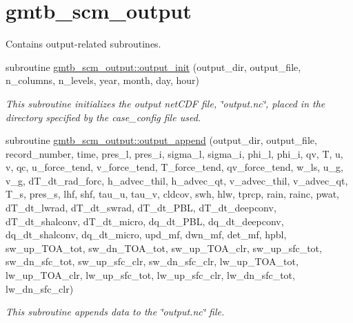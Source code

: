 \hypertarget{group__output}{}\section{gmtb\+\_\+scm\+\_\+output}
\label{group__output}


Contains output-\/related subroutines.  


\begin{DoxyCompactItemize}
\item 
subroutine \hyperlink{group__output_gaa9451ee5665313bbfefdd24800338a95}{gmtb\+\_\+scm\+\_\+output\+::output\+\_\+init} (output\+\_\+dir, output\+\_\+file, n\+\_\+columns, n\+\_\+levels, year, month, day, hour)
\begin{DoxyCompactList}\small\item\em This subroutine initializes the output net\+C\+DF file, \char`\"{}output.\+nc\char`\"{}, placed in the directory specified by the case\+\_\+config file used. \end{DoxyCompactList}\end{DoxyCompactItemize}
\begin{DoxyCompactItemize}
\item 
subroutine \hyperlink{group__output_gab0bd4f42c7b5f1cafe9879343e860d8b}{gmtb\+\_\+scm\+\_\+output\+::output\+\_\+append} (output\+\_\+dir, output\+\_\+file, record\+\_\+number, time, pres\+\_\+l, pres\+\_\+i, sigma\+\_\+l, sigma\+\_\+i, phi\+\_\+l, phi\+\_\+i, qv, T, u, v, qc,   u\+\_\+force\+\_\+tend, v\+\_\+force\+\_\+tend, T\+\_\+force\+\_\+tend, qv\+\_\+force\+\_\+tend, w\+\_\+ls, u\+\_\+g, v\+\_\+g, d\+T\+\_\+dt\+\_\+rad\+\_\+forc, h\+\_\+advec\+\_\+thil, h\+\_\+advec\+\_\+qt, v\+\_\+advec\+\_\+thil,   v\+\_\+advec\+\_\+qt, T\+\_\+s, pres\+\_\+s, lhf, shf, tau\+\_\+u, tau\+\_\+v, cldcov, swh, hlw, tprcp, rain, rainc, pwat, d\+T\+\_\+dt\+\_\+lwrad, d\+T\+\_\+dt\+\_\+swrad, d\+T\+\_\+dt\+\_\+\+P\+BL, d\+T\+\_\+dt\+\_\+deepconv, d\+T\+\_\+dt\+\_\+shalconv, d\+T\+\_\+dt\+\_\+micro, dq\+\_\+dt\+\_\+\+P\+BL, dq\+\_\+dt\+\_\+deepconv, dq\+\_\+dt\+\_\+shalconv, dq\+\_\+dt\+\_\+micro, upd\+\_\+mf, dwn\+\_\+mf, det\+\_\+mf,   hpbl, sw\+\_\+up\+\_\+\+T\+O\+A\+\_\+tot, sw\+\_\+dn\+\_\+\+T\+O\+A\+\_\+tot, sw\+\_\+up\+\_\+\+T\+O\+A\+\_\+clr, sw\+\_\+up\+\_\+sfc\+\_\+tot, sw\+\_\+dn\+\_\+sfc\+\_\+tot, sw\+\_\+up\+\_\+sfc\+\_\+clr, sw\+\_\+dn\+\_\+sfc\+\_\+clr, lw\+\_\+up\+\_\+\+T\+O\+A\+\_\+tot,   lw\+\_\+up\+\_\+\+T\+O\+A\+\_\+clr, lw\+\_\+up\+\_\+sfc\+\_\+tot, lw\+\_\+up\+\_\+sfc\+\_\+clr, lw\+\_\+dn\+\_\+sfc\+\_\+tot, lw\+\_\+dn\+\_\+sfc\+\_\+clr)
\begin{DoxyCompactList}\small\item\em This subroutine appends data to the \char`\"{}output.\+nc\char`\"{} file. \end{DoxyCompactList}\end{DoxyCompactItemize}



